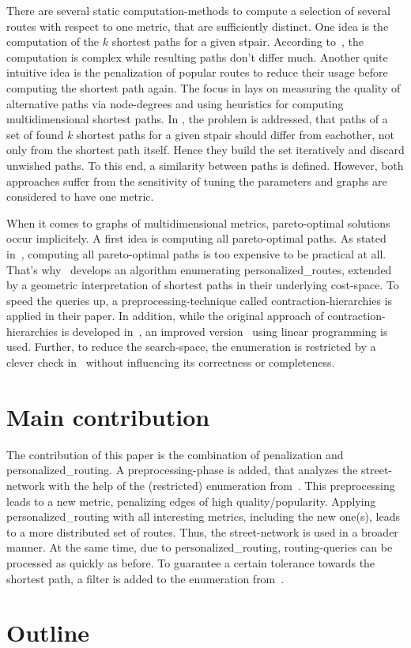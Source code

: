         There are several static computation-methods to compute a selection of several routes with respect to one metric, that are sufficiently distinct.
        One idea is the computation of the $k$ shortest paths for a given \gls{stpair}.
        According to~\cite{eppstein:finding_k_shortest_paths}, the computation is complex while resulting paths don't differ much.
        Another quite intuitive idea is the penalization of popular routes to reduce their usage before computing the shortest path again.
        The focus in \cite{bader:alternative-route-graphs} lays on measuring the quality of alternative paths via node-degrees and using heuristics for computing multidimensional shortest paths.
        In \cite{chondrogiannis:k_shortest_paths}, the problem is addressed, that paths of a set of found $k$ shortest paths for a given \gls{stpair} should differ from eachother, not only from the shortest path itself.
        Hence they build the set iteratively and discard unwished paths.
        To this end, a similarity between paths is defined.
        However, both approaches suffer from the sensitivity of tuning the parameters and graphs are considered to have one metric.

        When it comes to graphs of multidimensional metrics, pareto-optimal solutions occur implicitely.
        A first idea is computing all pareto-optimal paths.
        As stated in~\cite{delling:pareto-paths}, computing all pareto-optimal paths is too expensive to be practical at all.
        That's why~\cite{barth:alternative_multicriteria_routes} develops an algorithm enumerating \glspl{personalized_route}, extended by a geometric interpretation of shortest paths in their underlying cost-space.
        To speed the queries up, a preprocessing-technique called \gls{contraction-hierarchies} is applied in their paper.
        In addition, while the original approach of contraction-hierarchies is developed in~\cite{geisberger:contraction_hierarchies}, an improved version~\cite{funke:personal-routes} using linear programming is used.
        Further, to reduce the search-space, the enumeration is restricted by a clever check in~\cite{barth:alternative_routes} without influencing its correctness or completeness.

\section{Main contribution}

    The contribution of this paper is the combination of penalization and \gls{personalized_routing}.
    A preprocessing-phase is added, that analyzes the street-network with the help of the (restricted) enumeration from~\cite{barth:alternative_multicriteria_routes}.
    This preprocessing leads to a new metric, penalizing edges of high quality/popularity.
    Applying \gls{personalized_routing} with all interesting metrics, including the new one(s), leads to a more distributed set of routes.
    Thus, the street-network is used in a broader manner.
    At the same time, due to \gls{personalized_routing}, routing-queries can be processed as quickly as before.
    To guarantee a certain tolerance towards the shortest path, a filter is added to the enumeration from~\cite{barth:alternative_multicriteria_routes}.

\section{Outline}

